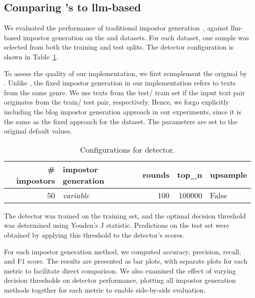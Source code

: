 \subsection{Comparing \citet{koppel_determining_2014}'s to \ac{llm}-based \imps{}}
\label{subsec:imp_gen}

We evaluated the performance of traditional impostor generation~\citep{koppel_determining_2014}, against \ac{llm}-based impostor generation on the \dataBlog{} and \dataStudent{} datasets. 
For each dataset, one sample was selected from both the training and test splits. 
The detector configuration is shown in Table~\ref{tab:imp_gen_comp}.

To assess the quality of our \impAppr{} implementation, we first reimplement the original \impAppr{} by \citet{koppel_determining_2014}.
Unlike \citet{koppel_determining_2014}, the fixed impostor generation in our implementation refers to texts from the same genre.
We use texts from the test/ train set if the input text pair originates from the train/ test pair, respectively.
Hence, we forgo explicitly including the blog impostor generation approach in our experiments, since it is the same as the fixed approach for the \dataBlog{} dataset.
The parameters are set to the original default values.

\begin{table}[h]
\centering\small
\caption{Configurations for detector.}
\label{tab:imp_gen_comp}
\begin{tabular}{@{}rlrrl@{}}   %
\toprule
\# impostors & impostor generation & rounds & top\_n & upsample \\
\midrule
50 & \textit{variable} & 100 & \num{100000} & False \\
\bottomrule
\end{tabular}%
\end{table}

The detector was trained on the training set, and the optimal decision threshold was determined using Youden’s J statistic. 
Predictions on the test set were obtained by applying this threshold to the detector’s scores.

For each impostor generation method, we computed accuracy, precision, recall, and F1 score. 
The results are presented as bar plots, with separate plots for each metric to facilitate direct comparison. 
We also examined the effect of varying decision thresholds on detector performance, plotting all impostor generation methods together for each metric to enable side-by-side evaluation.
